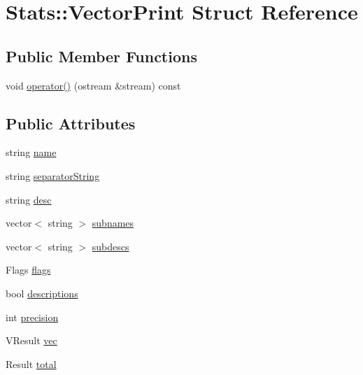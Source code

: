 \hypertarget{structStats_1_1VectorPrint}{
\section{Stats::VectorPrint Struct Reference}
\label{structStats_1_1VectorPrint}
}
\subsection*{Public Member Functions}
\begin{DoxyCompactItemize}
\item 
void \hyperlink{structStats_1_1VectorPrint_a68ba1f354848bef75b688af324b9179c}{operator()} (ostream \&stream) const 
\end{DoxyCompactItemize}
\subsection*{Public Attributes}
\begin{DoxyCompactItemize}
\item 
string \hyperlink{structStats_1_1VectorPrint_aa1c8b85457fa70786c79d0196cffb548}{name}
\item 
string \hyperlink{structStats_1_1VectorPrint_a61e9ebc60bf9485f5a28c6b7fa0dcb88}{separatorString}
\item 
string \hyperlink{structStats_1_1VectorPrint_abf91a47332e2e5d565e16c24b92b5988}{desc}
\item 
vector$<$ string $>$ \hyperlink{structStats_1_1VectorPrint_a584fa8575a02b844676d7dac1f99b8d5}{subnames}
\item 
vector$<$ string $>$ \hyperlink{structStats_1_1VectorPrint_ad41b5952812a233f57034740cd6193e2}{subdescs}
\item 
Flags \hyperlink{structStats_1_1VectorPrint_a560393c8e7059f844bc7045d863df2f5}{flags}
\item 
bool \hyperlink{structStats_1_1VectorPrint_a8f833bcb63a2f90b369553a62e2b42ce}{descriptions}
\item 
int \hyperlink{structStats_1_1VectorPrint_a944b839b2d16ab471f66013d6e543b26}{precision}
\item 
VResult \hyperlink{structStats_1_1VectorPrint_a0c73337c9840ea8e285fd5fbebaf90b1}{vec}
\item 
Result \hyperlink{structStats_1_1VectorPrint_a739c34030fdd6f5dfcc4df58420a4e9f}{total}
\end{DoxyCompactItemize}


